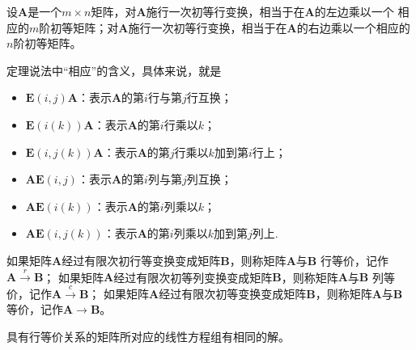 \begin{theorem}[初等变换与初等矩阵]
    设$\boldsymbol{A}$是一个$m\times n$矩阵，对$\boldsymbol{A}$施行一次初等行变换，相当于在$\boldsymbol{A}$的左边乘以一个
    相应的$m$阶初等矩阵；对$\boldsymbol{A}$施行一次初等行变换，相当于在$\boldsymbol{A}$的右边乘以一个相应的$n$阶初等矩阵。
\end{theorem}
\begin{remark}
    定理说法中“相应”的含义，具体来说，就是
    \begin{itemize}
        \item $\boldsymbol{E}(i,j)\boldsymbol{A}$：表示$\boldsymbol{A}$的第$i$行与第$j$行互换；
        \item $\boldsymbol{E}(i(k))\boldsymbol{A}$：表示$\boldsymbol{A}$的第$i$行乘以$k$；
        \item $\boldsymbol{E}(i,j(k))\boldsymbol{A}$：表示$\boldsymbol{A}$的第$j$行乘以$k$加到第$i$行上；
        \item $\boldsymbol{A}\boldsymbol{E}(i,j)$：表示$\boldsymbol{A}$的第$i$列与第$j$列互换；
        \item $\boldsymbol{A}\boldsymbol{E}(i(k))$：表示$\boldsymbol{A}$的第$i$列乘以$k$；
        \item $\boldsymbol{A}\boldsymbol{E}(i,j(k))$：表示$\boldsymbol{A}$的第$i$列乘以$k$加到第$j$列上.
    \end{itemize}
\end{remark}

\begin{definition}
    如果矩阵$\boldsymbol{A}$经过有限次初行等变换变成矩阵$\boldsymbol{B}$，则称矩阵$\boldsymbol{A}$与$\boldsymbol{B}$
    {\heiti 行等价}，记作$\boldsymbol{A}\stackrel{r}{\longrightarrow}\boldsymbol{B}$；
    如果矩阵$\boldsymbol{A}$经过有限次初等列变换变成矩阵$\boldsymbol{B}$，则称矩阵$\boldsymbol{A}$与$\boldsymbol{B}$
    {\heiti 列等价}，记作$\boldsymbol{A}\stackrel{c}{\longrightarrow}\boldsymbol{B}$；
    如果矩阵$\boldsymbol{A}$经过有限次初等变换变成矩阵$\boldsymbol{B}$，则称矩阵$\boldsymbol{A}$与$\boldsymbol{B}$
    {\heiti 等价}，记作$\boldsymbol{A}\stackrel{}{\longrightarrow}\boldsymbol{B}$。
\end{definition}

\begin{theorem}
    具有行等价关系的矩阵所对应的线性方程组有相同的解。
\end{theorem}

